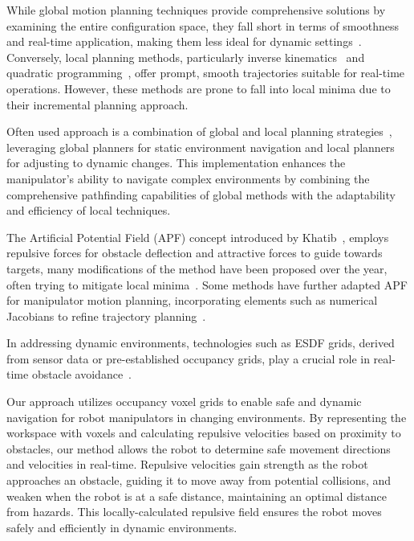 \documentclass[letterpaper, 10 pt, conference]{ieeeconf}  %
\begin{document}
While global motion planning techniques provide comprehensive solutions by examining the entire configuration space, they fall short in terms of smoothness and real-time application, making them less ideal for dynamic settings~\cite{lavalle1998rapidly, gammell2015batch, karaman2010incremental,kuffner2000rrt}. Conversely, local planning methods, particularly inverse kinematics~\cite{c29,c38} and quadratic programming~\cite{c21,c23}, offer prompt, smooth trajectories suitable for real-time operations. However, these methods are prone to fall into local minima due to their incremental planning approach.

Often used approach is a combination of global and local planning strategies~\cite{c44}, leveraging global planners for static environment navigation and local planners for adjusting to dynamic changes. This implementation enhances the manipulator's ability to navigate complex environments by combining the comprehensive pathfinding capabilities of global methods with the adaptability and efficiency of local techniques.

The Artificial Potential Field (APF) concept introduced by Khatib~\cite{c33}, employs repulsive forces for obstacle deflection and attractive forces to guide towards targets, many modifications of the method have been proposed over the year, often trying to mitigate local minima~\cite{c43,c45,c47,klancar2022robot}. Some methods have further adapted APF for manipulator motion planning, incorporating elements such as numerical Jacobians to refine trajectory planning~\cite{c49,park2020trajectory,baumgartner2023potential}.

In addressing dynamic environments, technologies such as ESDF grids, derived from sensor data or pre-established occupancy grids, play a crucial role in real-time obstacle avoidance~\cite{oleynikova2017voxblox,han2019fiesta,lau2010improved,rong2006jump,zhou2021egoplanner}. 


Our approach utilizes occupancy voxel grids to enable safe and dynamic navigation for robot manipulators in changing environments. By representing the workspace with voxels and calculating repulsive velocities based on proximity to obstacles, our method allows the robot to determine safe movement directions and velocities in real-time. Repulsive velocities gain strength as the robot approaches an obstacle, guiding it to move away from potential collisions, and weaken when the robot is at a safe distance, maintaining an optimal distance from hazards. This locally-calculated repulsive field ensures the robot moves safely and efficiently in dynamic environments.
\end{document}
